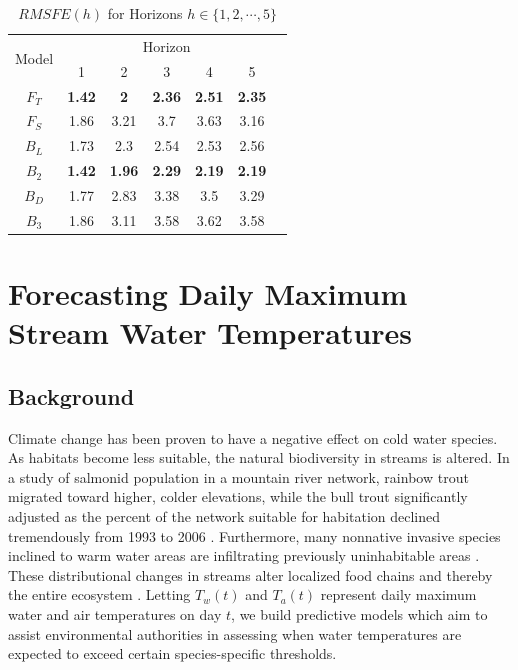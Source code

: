 \begin{table}[!h]
	\small
  \centering
  \caption{$RMSFE(h)$ for Horizons $h \in \{1,2,\cdots,5\}$}
    \begin{tabular}{ccccccc}
    \toprule
     \multirow{2}[0]{*}{Model} & \multicolumn{5}{c}{Horizon} \\
                 & 1    & 2    & 3    & 4    & 5 \\
         \midrule
     $F_T$ &  {\bf 1.42} &  {\bf2}    &  {\bf2.36} &  {\bf2.51} & {\bf2.35} \\
            $F_S$ & 1.86 & 3.21 & 3.7  & 3.63 & 3.16 \\
         \midrule
       $B_L$ & 1.73 & 2.3  & 2.54 & 2.53 & 2.56 \\
        $B_2$ & {\bf 1.42} & {\bf1.96} &  {\bf2.29} &  {\bf2.19} & {\bf2.19} \\
         $B_D$ & 1.77 & 2.83 & 3.38 & 3.5  & 3.29 \\
          $B_3$ & 1.86 & 3.11 & 3.58 & 3.62 & 3.58 \\
    \bottomrule
    \end{tabular}%
  \label{tab:ssrmsfe}%
\end{table}%


\section{Forecasting Daily Maximum Stream Water Temperatures}

\subsection{Background}

Climate change has been proven to have a negative effect on cold water species. As habitats become less suitable, the natural biodiversity in streams is altered. In a study of salmonid population in a mountain river network, rainbow trout migrated toward higher, colder elevations, while the bull trout significantly adjusted as the percent of the network suitable for habitation declined tremendously from 1993 to 2006 \citep{Isaak2010}. Furthermore, many nonnative invasive species inclined to warm water areas are infiltrating previously uninhabitable areas \citep{Rahel2008}. These distributional changes in streams alter localized food chains and thereby the entire ecosystem \citep{Albouy2014}. Letting $T_w(t)$ and $T_a(t)$ represent daily maximum water and air temperatures on day $t$, we build predictive models which aim to assist environmental authorities in assessing when water temperatures are expected to exceed certain species-specific thresholds.

